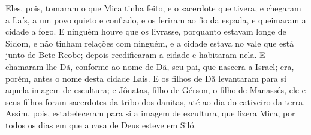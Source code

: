 Eles, pois, tomaram o que Mica tinha feito, e o sacerdote que
tivera, e chegaram a Laís, a um povo quieto e confiado, e os feriram
ao fio da espada, e queimaram a cidade a fogo. E ninguém
houve que os livrasse, porquanto estavam longe de Sidom, e não
tinham relações com ninguém, e a cidade estava no vale que está
junto de Bete-Reobe; depois reedificaram a cidade e habitaram nela.
E chamaram-lhe Dã, conforme ao nome de Dã, seu pai, que
nascera a Israel; era, porém, antes o nome desta cidade Laís.
E os filhos de Dã levantaram para si aquela imagem de
escultura; e Jônatas, filho de Gérson, o filho de Manassés, ele e
seus filhos foram sacerdotes da tribo dos danitas, até ao dia do
cativeiro da terra. Assim, pois, estabeleceram para si a
imagem de escultura, que fizera Mica, por todos os dias em que a
casa de Deus esteve em Siló.

\medskip

